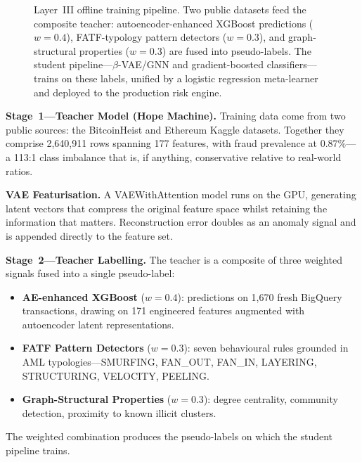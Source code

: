 \documentclass[journal]{IEEEtran}
\begin{document}
\begin{figure}[!t]
\caption{Layer~III offline training pipeline. Two public datasets feed the composite teacher: autoencoder-enhanced XGBoost predictions ($w{=}0.4$), FATF-typology pattern detectors ($w{=}0.3$), and graph-structural properties ($w{=}0.3$) are fused into pseudo-labels. The student pipeline---$\beta$-VAE/GNN and gradient-boosted classifiers---trains on these labels, unified by a logistic regression meta-learner and deployed to the production risk engine.}
\label{fig:ml_pipeline}
\end{figure}

\textbf{Stage~1---Teacher Model (Hope Machine).} Training data come from two public sources: the BitcoinHeist and Ethereum Kaggle datasets. Together they comprise 2,640,911 rows spanning 177 features, with fraud prevalence at 0.87\%---a 113:1 class imbalance that is, if anything, conservative relative to real-world ratios.

\textbf{VAE Featurisation.} A VAEWithAttention model runs on the GPU, generating latent vectors that compress the original feature space whilst retaining the information that matters. Reconstruction error doubles as an anomaly signal and is appended directly to the feature set.

\textbf{Stage~2---Teacher Labelling.} The teacher is a composite of three weighted signals fused into a single pseudo-label:
\begin{itemize}
  \item \textbf{AE-enhanced XGBoost} ($w = 0.4$): predictions on 1,670 fresh BigQuery transactions, drawing on 171 engineered features augmented with autoencoder latent representations.
  \item \textbf{FATF Pattern Detectors} ($w = 0.3$): seven behavioural rules grounded in AML typologies---SMURFING, FAN\_OUT, FAN\_IN, LAYERING, STRUCTURING, VELOCITY, PEELING.
  \item \textbf{Graph-Structural Properties} ($w = 0.3$): degree centrality, community detection, proximity to known illicit clusters.
\end{itemize}
The weighted combination produces the pseudo-labels on which the student pipeline trains.
\end{document}

